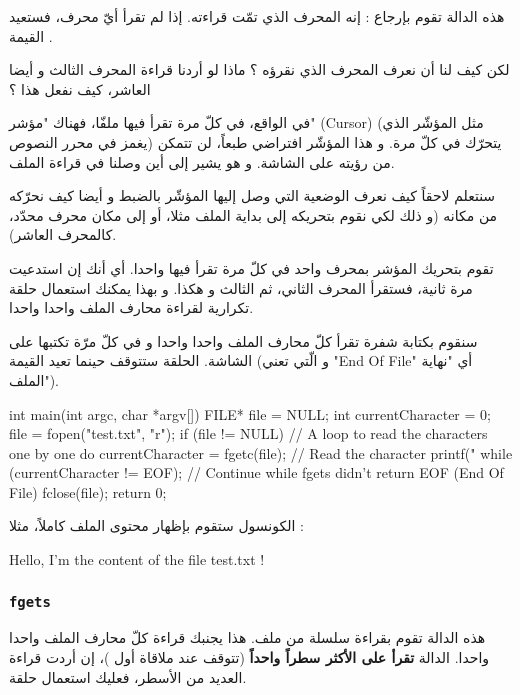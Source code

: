 هذه الدالة تقوم بإرجاع
 :
إنه المحرف الذي تمّت قراءته.
إذا لم تقرأ أيّ محرف، فستعيد القيمة
.

\begin{question}
لكن كيف لنا أن نعرف المحرف الذي نقرؤه ؟ ماذا لو أردنا قراءة المحرف الثالث و أيضا العاشر، كيف نفعل هذا ؟
\end{question}

في الواقع، في كلّ مرة تقرأ فيها ملفّا، فهناك "مؤشر"
(\textenglish{Cursor})
(مثل المؤشّر الذي يغمز في محرر النصوص) يتحرّك في كلّ مرة. و هذا المؤشّر افتراضي طبعاً، لن تتمكن من رؤيته على الشاشة. و هو يشير إلى أين وصلنا في قراءة الملف.

سنتعلم لاحقاً كيف نعرف الوضعية التي وصل إليها المؤشّر بالضبط و أيضا كيف نحرّكه من مكانه (و ذلك لكي نقوم بتحريكه إلى بداية الملف مثلا، أو إلى مكان محرف محدّد، كالمحرف العاشر).

تقوم بتحريك المؤشر بمحرف واحد في كلّ مرة تقرأ فيها واحدا. أي أنك إن استدعيت
مرة ثانية، فستقرأ المحرف الثاني، ثم الثالث و هكذا. و بهذا يمكنك استعمال حلقة تكرارية لقراءة محارف الملف واحدا واحدا.

سنقوم بكتابة شفرة تقرأ كلّ محارف الملف واحدا واحدا و في كلّ مرّة تكتبها على الشاشة. الحلقة ستتوقف حينما تعيد
القيمة
(و الّتي تعني
"\textenglish{End Of File}"
أي "نهاية الملف").

\begin{Csource}
int main(int argc, char *argv[])
{
	FILE* file = NULL;
	int currentCharacter = 0;
	file = fopen("test.txt", "r");
	if (file != NULL)
	{
  		// A loop to read the characters one by one
  		do
  		{
    			currentCharacter = fgetc(file); // Read the character
    			printf("%
  		} while (currentCharacter != EOF); // Continue while fgets didn't return EOF (End Of File)
  		fclose(file);
	}
	return 0;
}
\end{Csource}

الكونسول ستقوم بإظهار محتوى الملف كاملاً، مثلا :

\begin{Console}
Hello, I'm the content of the file test.txt !
\end{Console}

\subsubsection{\texttt{fgets}}

هذه الدالة تقوم بقراءة سلسلة من ملف. هذا يجنبك قراءة كلّ محارف الملف واحدا واحدا. الدالة
\textbf{تقرأ على الأكثر سطراً واحداً}
(تتوقف عند ملاقاة أول
)،
إن أردت قراءة العديد من الأسطر، فعليك استعمال حلقة.

